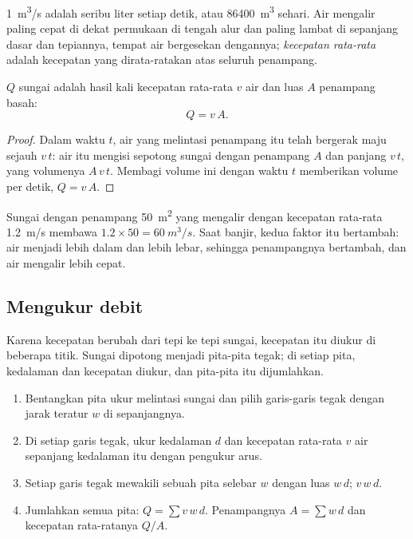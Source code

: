  \qty{1}{m^3/s} adalah seribu liter setiap detik, atau
\qty{86400}{m^3} sehari. Air mengalir paling cepat di dekat permukaan di
tengah alur dan paling lambat di sepanjang dasar dan tepiannya, tempat air
bergesekan dengannya; \emph{kecepatan rata-rata} adalah kecepatan yang
dirata-ratakan atas seluruh penampang.

\begin{proposition}\label{prop:g10:drainage-basins:discharge}
 $Q$ sungai adalah hasil kali kecepatan rata-rata $v$ air dan luas $A$
penampang basah:
\[
Q = v\,A.
\]
\end{proposition}

\begin{proof}
Dalam waktu $t$, air yang melintasi penampang itu telah bergerak maju sejauh
$v\,t$: air itu mengisi sepotong sungai dengan penampang $A$ dan panjang
$v\,t$, yang volumenya $A\,v\,t$. Membagi volume ini dengan waktu $t$
memberikan volume per detik, $Q = v\,A$.
\end{proof}

Sungai dengan penampang \qty{50}{m^2} yang mengalir dengan kecepatan rata-rata
\qty{1.2}{m/s} membawa $1.2 \times 50 = \qty{60}{m^3/s}$. Saat banjir, kedua
faktor itu bertambah: air menjadi lebih dalam dan lebih lebar, sehingga
penampangnya bertambah, dan air mengalir lebih cepat.

\subsection*{Mengukur debit}

Karena kecepatan berubah dari tepi ke tepi sungai, kecepatan itu diukur di
beberapa titik. Sungai dipotong menjadi pita-pita tegak; di setiap pita,
kedalaman dan kecepatan diukur, dan  pita-pita itu dijumlahkan.

\begin{method}\label{met:g10:drainage-basins:velocity-area}
\begin{enumerate}
  \item Bentangkan pita ukur melintasi sungai dan pilih garis-garis tegak
        dengan jarak teratur $w$ di sepanjangnya.
  \item Di setiap garis tegak, ukur kedalaman $d$ dan kecepatan rata-rata $v$
        air sepanjang kedalaman itu dengan pengukur arus.
  \item Setiap garis tegak mewakili sebuah pita selebar $w$ dengan luas
        $w\,d$;  $v\,w\,d$.
  \item Jumlahkan  semua pita: $Q = \sum v\,w\,d$.
        Penampangnya $A = \sum w\,d$ dan kecepatan rata-ratanya $Q/A$.
\end{enumerate}
\end{method}

